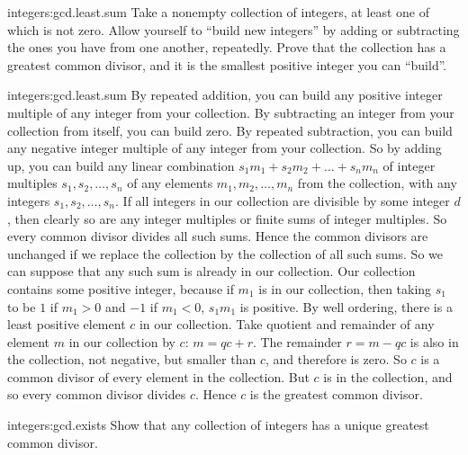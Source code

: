 \begin{problem*}{integers:gcd.least.sum}
Take a nonempty collection of integers, at least one of which is not zero.
Allow yourself to ``build new integers'' by adding or subtracting the ones you have from one another, repeatedly.
Prove that the collection has a greatest common divisor, and it is the smallest positive integer you can ``build''.
\end{problem*}
\begin{answer}{integers:gcd.least.sum}
By repeated addition, you can build any positive integer multiple of any integer from your collection.
By subtracting an integer from your collection from itself,  you can build zero.
By repeated subtraction, you can build any negative integer multiple of any integer from your collection.
So by adding up, you can build any linear combination \(s_1m_1+s_2m_2+\dots+s_nm_n\) of integer multiples \(s_1,s_2,\dots,s_n\) of any elements \(m_1,m_2,\dots,m_n\) from the collection,  with any integers \(s_1,s_2,\dots,s_n\).
If all integers in our collection are divisible by some integer \(d\), then clearly so are any integer multiples or finite sums of integer multiples.
So every common divisor divides all such sums.
Hence the common divisors are unchanged if we replace the collection by the collection of all such sums.
So we can suppose that any such sum is already in our collection.
Our collection contains some positive integer, because if \(m_1\) is in our collection, then taking \(s_1\) to be \(1\) if \(m_1>0\) and \(-1\) if \(m_1<0\), \(s_1m_1\) is positive.
By well ordering, there is a least positive element \(c\) in our collection.
Take quotient and remainder of any element \(m\) in our collection by \(c\): \(m=qc+r\).
The remainder \(r=m-qc\) is also in the collection, not negative, but smaller than \(c\), and therefore is zero.
So \(c\) is a common divisor of every element in the collection.
But \(c\) is in the collection, and so every common divisor divides \(c\).
Hence \(c\) is the greatest common divisor. 
\end{answer}
\begin{problem}{integers:gcd.exists}
Show that any collection of integers has a unique greatest common divisor. 
\end{problem}

